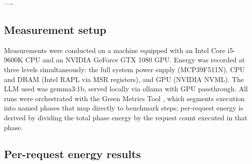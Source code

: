 ----


\subsection{Measurement setup}
Measurements were conducted on a machine equipped with an Intel Core i5-9600K CPU and an NVIDIA GeForce GTX 1080 GPU. Energy was recorded at three levels simultaneously: the full system power supply (MCP39F511N), CPU and DRAM (Intel RAPL via MSR registers), and GPU (NVIDIA NVML). The LLM used was gemma3:1b, served locally via ollama with GPU passthrough. All runs were orchestrated with the Green Metrics Tool \cite{gmt}, which segments execution into named phases that map directly to benchmark steps; per-request energy is derived by dividing the total phase energy by the request count executed in that phase.

\subsection{Per-request energy results}

